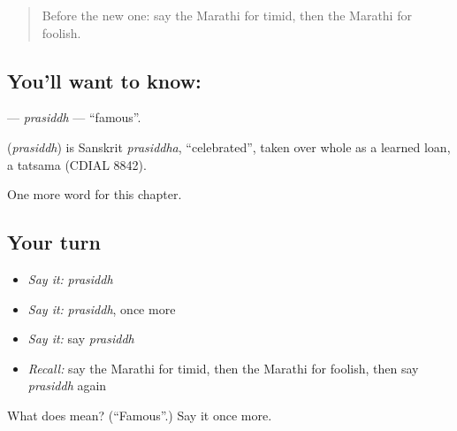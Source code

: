 \label{lesson:MR-C151-prasiddh}



\begin{quote}
Before the new one: say the Marathi for timid, then the Marathi for foolish.
\end{quote}

\subsection*{You'll want to know: }
\textbf{} — \emph{prasiddh} — \textquotedblleft{}famous\textquotedblright{}.

\begin{cousinweb}
\textbf{} (\emph{prasiddh}) is Sanskrit \emph{prasiddha}, \textquotedblleft{}celebrated\textquotedblright{}, taken over whole as a learned loan, a tatsama (CDIAL 8842).
\end{cousinweb}

\begin{grammarlens}[title={What you've built}]
One more word for this chapter.
\end{grammarlens}

\subsection*{Your turn}
\begin{itemize}
\raggedright
  \item \emph{Say it:} \emph{prasiddh}
  \item \emph{Say it:} \emph{prasiddh}, once more
  \item \emph{Say it:} say \emph{prasiddh}
  \item \emph{Recall:} say the Marathi for timid, then the Marathi for foolish, then say \emph{prasiddh} again
\end{itemize}

\begin{tcolorbox}[breakable,colback=teal!4,colframe=teal!35!black,title={Before you move on}]
What does  mean? (\textquotedblleft{}Famous\textquotedblright{}.) Say it once more.
\end{tcolorbox}
